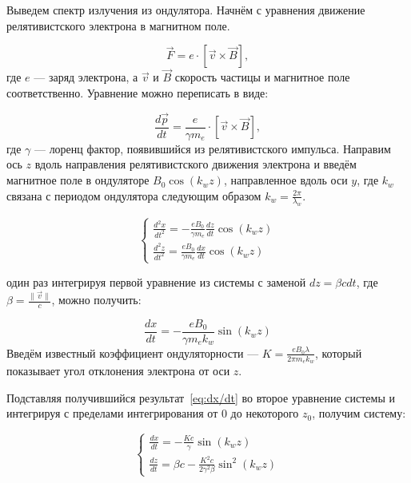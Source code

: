 \documentclass[14pt,a4paper]{extarticle}
\begin{document}
Выведем спектр излучения из ондулятора. Начнём с уравнения движение релятивистского электрона в магнитном поле.

\begin{equation}
	\vec{F} = e \cdot[\vec{v} \times \vec{B}],
\end{equation} 
где $e$ --- заряд электрона, а $\vec{v}$ и $\vec{B}$ скорость частицы и магнитное поле соответственно. Уравнение можно переписать в виде:

\begin{equation}
	\frac{d\vec{p}}{dt} = \frac{e}{\gamma m_e}\cdot [\vec{v} \times \vec{B}],
\end{equation}
где $\gamma$ --- лоренц фактор, появившийся из релятивистского импульса. Направим ось $z$ вдоль направления релятивистского движения электрона и введём магнитное поле в ондуляторе $B_0\cos(k_w z)$, направленное вдоль оси $y$, где $k_w$ связана с периодом ондулятора следующим образом $k_w = \frac{2\pi}{\lambda_w}$. 

\begin{equation}
	\begin{cases}
		\frac{d^2 x}{dt^2} = - \frac{e B_0}{\gamma m_e}\frac{dz}{dt} \cos(k_w z)\\
		\frac{d^2 z}{dt^2} = \frac{e B_0}{\gamma m_e}\frac{dx}{dt} \cos(k_w z)
	\end{cases} 
\end{equation}

один раз интегрируя первой уравнение из системы с заменой $dz = \beta cdt$, где $\beta = \frac{\|\vec{v}\|}{c}$, можно получить: 

\begin{equation}
 	\label{eq:dx/dt}
	\frac{dx}{dt} = - \frac{eB_0}{\gamma m_ek_w} \sin(k_w z)
\end{equation}
Введём известный коэффициент ондуляторности --- $K = \frac{eB_0 \lambda}{2\pi m_ek_w}$, который показывает угол отклонения электрона от оси $z$. 

Подставляя получившийся результат~\ref{eq:dx/dt} во второе уравнение системы и интегрируя с пределами интегрирования от $0$ до некоторого $z_0$, получим систему:

\begin{equation}
	\begin{cases}
		\frac{dx}{dt} = - \frac{Kc}{\gamma} \sin(k_w z)\\
		\frac{dz}{dt} = \beta c - \frac{K^2 c}{2 \gamma^2 \beta}\sin^2(k_w z)
	\end{cases} 
\end{equation}
\end{document}
